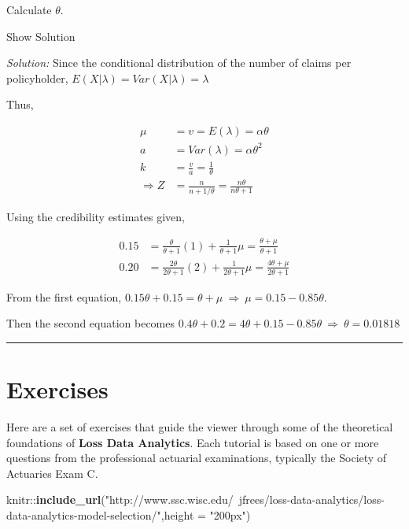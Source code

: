 \documentclass[]{book}
\newenvironment{Shaded}{\begin{snugshade}}{\end{snugshade}}
\newcommand{\KeywordTok}[1]{\textcolor[rgb]{0.13,0.29,0.53}{\textbf{{#1}}}}
\newcommand{\DataTypeTok}[1]{\textcolor[rgb]{0.13,0.29,0.53}{{#1}}}
\newcommand{\StringTok}[1]{\textcolor[rgb]{0.31,0.60,0.02}{{#1}}}
\newcommand{\NormalTok}[1]{{#1}}
\theoremstyle{definition}
\theoremstyle{definition}
\theoremstyle{definition}
\theoremstyle{remark}
\begin{document}
Calculate \(\theta\).

Show Solution

\hypertarget{toggleExamC215}{}
\emph{Solution:} Since the conditional distribution of the number of
claims per policyholder, \(E(X|\lambda)=Var(X|\lambda)=\lambda\)

Thus,

\[\begin{aligned}
\mu &= v = E(\lambda) = \alpha\theta \\
a &= Var(\lambda) = \alpha\theta^2 \\
k &= \frac{v}{a} = \frac{1}{\theta} \\
\Rightarrow Z &= \frac{n}{n+1/\theta} = \frac{n\theta}{n\theta+1}
\end{aligned}\]

Using the credibility estimates given,

\[\begin{aligned}
0.15 &= \frac{\theta}{\theta + 1}(1) + \frac{1}{\theta + 1}\mu = \frac{\theta + \mu}{\theta + 1} \\
0.20 &= \frac{2\theta}{2\theta+1}(2) + \frac{1}{2\theta+1}\mu = \frac{4\theta+\mu}{2\theta+1}
\end{aligned}\]

From the first equation,
\(0.15\theta + 0.15 = \theta + \mu \ \Rightarrow \ \mu = 0.15- 0.85\theta\).

Then the second equation becomes
\(0.4\theta + 0.2 = 4\theta + 0.15 - 0.85\theta \ \Rightarrow \ \theta=0.01818\)

\begin{center}\rule{0.5\linewidth}{\linethickness}\end{center}

\section{Exercises}\label{exercises-2}

Here are a set of exercises that guide the viewer through some of the
theoretical foundations of \textbf{Loss Data Analytics}. Each tutorial
is based on one or more questions from the professional actuarial
examinations, typically the Society of Actuaries Exam C.

\begin{Shaded}
\begin{Highlighting}[]
\NormalTok{knitr::}\KeywordTok{include_url}\NormalTok{(}\StringTok{"http://www.ssc.wisc.edu/~jfrees/loss-data-analytics/loss-data-analytics-model-selection/"}\NormalTok{,}\DataTypeTok{height =} \StringTok{"200px"}\NormalTok{)}
\end{Highlighting}
\end{Shaded}
\end{document}
